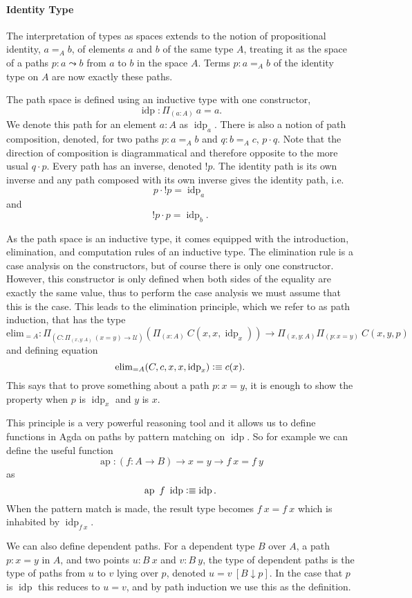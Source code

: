 \documentclass[12pt, parskip, DIV=14]{scrbook}
\newcommand{\defeq}{\vcentcolon\equiv}
\newcommand{\ap}{\operatorname{ap}}
\newcommand{\idp}{\operatorname{idp}}
\begin{document}
\paragraph{Identity Type}

The interpretation of types as spaces extends to the notion of propositional identity, $a =_A b$, of elements $a$ and $b$ of the same type $A$, treating it as the space of a paths $p : a \leadsto b$ from $a$ to $b$ in the space $A$. Terms $p : a =_A b$ of the identity type on $A$ are now exactly these paths.

The path space is defined using an inductive type with one constructor, $$\idp : \Pi_{(a : A)}~a = a.$$ We denote this path for an element $a : A$ as $\idp_a$. There is also a notion of path composition, denoted, for two paths $p : a =_A b$ and $q : b =_A c$, $p \cdot q$. Note that the direction of composition is diagrammatical and therefore opposite to the more usual $q \cdot p$. Every path has an inverse, denoted $!p$. The identity path is its own inverse and any path composed with its own inverse gives the identity path, i.e.
$$p \cdot {!}p = \idp_a$$
and
$$!p \cdot p = \idp_b.$$

As the path space is an inductive type, it comes equipped with the introduction, elimination, and computation rules of an inductive type. The elimination rule is a case analysis on the constructors, but of course there is only one constructor. However, this constructor is only defined when both sides of the equality are exactly the same value, thus to perform the case analysis we must assume that this is the case. This leads to the elimination principle, which we refer to as path induction, that has the type
$$\mathrm{elim}_{=A} : \Pi_{(C : \Pi_{(x,y : A)}~(x = y) \to \mathcal{U})} (\Pi_{(x:A)}~C(x,x,\idp_x)) \to \Pi_{(x,y : A)}\Pi_{(p : x = y)}~C(x,y,p)$$ and defining equation $$\mathrm{elim}_{=A}(C,c,x,x,\idp_x) \defeq c(x).$$ This says that to prove something about a path $p : x = y$, it is enough to show the property when $p$ is $\idp_x$ and $y$ is $x$.

This principle is a very powerful reasoning tool and it allows us to define functions in Agda on paths by pattern matching on $\idp$. So for example we can define the useful function $$\ap : (f : A \to B) \to x = y \to f~x = f~y$$ as $$\ap~f~\idp \defeq \idp.$$ When the pattern match is made, the result type becomes $f~x = f~x$ which is inhabited by $\idp_{f~x}$.

We can also define dependent paths. For a dependent type $B$ over $A$, a path $p : x = y$ in $A$, and two points $u : B~x$ and $v : B~y$, the type of dependent paths is the type of paths from $u$ to $v$ lying over $p$, denoted $u = v~[B \downarrow p]$. In the case that $p$ is $\idp$ this reduces to $u = v$, and by path induction we use this as the definition.
\end{document}
